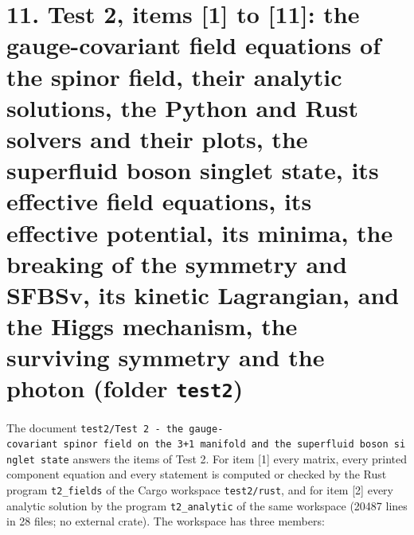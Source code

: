 \documentclass[
  10pt,
]{article}
\begin{document}
\hypertarget{test-2-items-1-to-11-the-gauge-covariant-field-equations-of-the-spinor-field-their-analytic-solutions-the-python-and-rust-solvers-and-their-plots-the-superfluid-boson-singlet-state-its-effective-field-equations-its-effective-potential-its-minima-the-breaking-of-the-symmetry-and-sfbsv-its-kinetic-lagrangian-and-the-higgs-mechanism-the-surviving-symmetry-and-the-photon-folder-test2}{%
\section{\texorpdfstring{11. Test 2, items {[}1{]} to {[}11{]}: the
gauge-covariant field equations of the spinor field, their analytic
solutions, the Python and Rust solvers and their plots, the superfluid
boson singlet state, its effective field equations, its effective
potential, its minima, the breaking of the symmetry and SFBSv, its
kinetic Lagrangian, and the Higgs mechanism, the surviving symmetry and
the photon (folder
\texttt{test2})}{11. Test 2, items {[}1{]} to {[}11{]}: the gauge-covariant field equations of the spinor field, their analytic solutions, the Python and Rust solvers and their plots, the superfluid boson singlet state, its effective field equations, its effective potential, its minima, the breaking of the symmetry and SFBSv, its kinetic Lagrangian, and the Higgs mechanism, the surviving symmetry and the photon (folder test2)}}\label{test-2-items-1-to-11-the-gauge-covariant-field-equations-of-the-spinor-field-their-analytic-solutions-the-python-and-rust-solvers-and-their-plots-the-superfluid-boson-singlet-state-its-effective-field-equations-its-effective-potential-its-minima-the-breaking-of-the-symmetry-and-sfbsv-its-kinetic-lagrangian-and-the-higgs-mechanism-the-surviving-symmetry-and-the-photon-folder-test2}}

The document
\texttt{test2/Test\ 2\ -\ the\ gauge-covariant\ spinor\ field\ on\ the\ 3+1\ manifold\ and\ the\ superfluid\ boson\ singlet\ state}
answers the items of Test 2. For item {[}1{]} every matrix, every
printed component equation and every statement is computed or checked by
the Rust program \texttt{t2\_fields} of the Cargo workspace
\texttt{test2/rust}, and for item {[}2{]} every analytic solution by the
program \texttt{t2\_analytic} of the same workspace (20487 lines in 28
files; no external crate). The workspace has three members:
\end{document}
